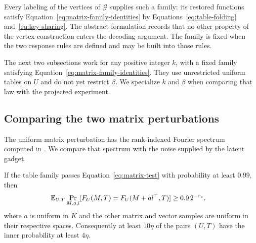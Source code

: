 Every labeling of the vertices of $\mathcal G$ supplies such a family:
its restored functions satisfy Equation~\eqref{eq:matrix-family-identities}
by Equations~\eqref{eq:table-folding} and~\eqref{eq:key-sharing}.  The
abstract formulation records that no other property of the vertex
construction enters the decoding argument.  The family is fixed when the
two response rules are defined and may be built into those rules.

The next two subsections work for any positive integer $k$, with a fixed
family satisfying Equation~\eqref{eq:matrix-family-identities}.  They use
unrestricted uniform tables on $U$ and do not yet restrict $\beta$.
We specialize $k$ and $\beta$ when comparing that law with the projected
experiment.

\subsection{Comparing the two matrix perturbations}

The uniform matrix perturbation has the rank-indexed Fourier spectrum
computed in \cite[Lemma~2.10 in the 2018 revision]{KMS23}. We compare
that spectrum with the noise supplied by the latent gadget.

\begin{lemma}
\label{lem:matrix-spectral}
If the table family passes Equation~\eqref{eq:matrix-test} with probability at
least $0.99$, then
\begin{equation}
 \mathbb E_{U,T}\Pr_{M,a,l}
   [F_U(M,T)=F_U(M+a l^\top,T)]
 \ge 0.9\,2^{-r_*},
 \label{eq:surrogate-acceptance}
\end{equation}
where $a$ is uniform in $K$ and the other matrix and vector samples are
uniform in their respective spaces.  Consequently at least $10\eta$ of
the pairs $(U,T)$ have the inner probability at least $4\eta$.
\end{lemma}


